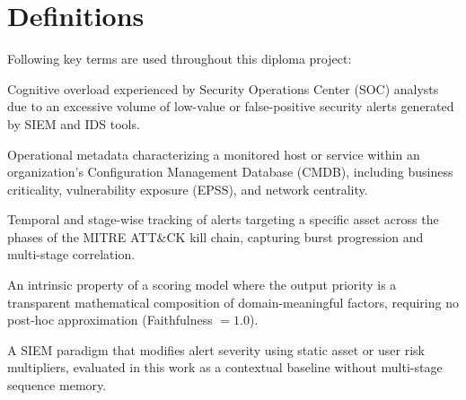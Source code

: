 \chapter{Definitions}

Following key terms are used throughout this diploma project:\par\bigskip

\begin{description}[style=multiline, labelwidth=5cm, leftmargin=5.5cm]

  \item[Alert Fatigue]
       Cognitive overload experienced by Security Operations Center (SOC) analysts due to an excessive volume of low-value or false-positive security alerts generated by SIEM and IDS tools.

  \item[Asset Context]
       Operational metadata characterizing a monitored host or service within an organization's Configuration Management Database (CMDB), including business criticality, vulnerability exposure (EPSS), and network centrality.

  \item[Event Sequence Analysis]
       Temporal and stage-wise tracking of alerts targeting a specific asset across the phases of the MITRE ATT\&CK kill chain, capturing burst progression and multi-stage correlation.

  \item[Explainability by Design]
       An intrinsic property of a scoring model where the output priority is a transparent mathematical composition of domain-meaningful factors, requiring no post-hoc approximation (Faithfulness $= 1.0$).

  \item[Risk-Based Alerting (RBA)]
       A SIEM paradigm that modifies alert severity using static asset or user risk multipliers, evaluated in this work as a contextual baseline without multi-stage sequence memory.

\end{description}
